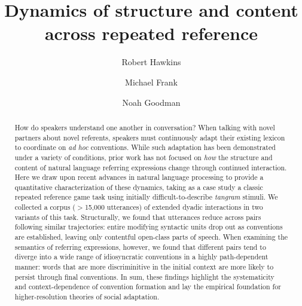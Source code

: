 \documentclass[alpha-refs]{wiley-article}
\title{Dynamics of structure and content across repeated reference}
\author[1]{Robert Hawkins}
\author[1]{Michael Frank}
\author[1,2]{Noah Goodman}
\affil[1]{Department of Psychology, Stanford University}
\affil[2]{Department of Computer Science, Stanford University}
\begin{document}
\maketitle





\begin{abstract}
How do speakers understand one another in conversation? 
When talking with novel partners about novel referents, speakers must continuously adapt their existing lexicon to coordinate on \emph{ad hoc} conventions. %
While such adaptation has been demonstrated under a variety of conditions, prior work has not focused on \emph{how} the structure and content of natural language referring expressions change through continued interaction.
Here we draw upon recent advances in natural language processing to provide a quantitative characterization of these dynamics, taking as a case study a classic repeated reference game task using initially difficult-to-describe \emph{tangram} stimuli.
We collected a corpus ($>$15,000 utterances) of extended dyadic interactions in two variants of this task.
Structurally, we found that utterances reduce across pairs following similar trajectories: entire modifying syntactic units drop out as conventions are established, leaving only contentful open-class parts of speech.
When examining the semantics of referring expressions, however, we found that different pairs tend to diverge into a wide range of idiosyncratic conventions in a highly path-dependent manner:  
words that are more discriminitive in the initial context are more likely to persist through final conventions.
In sum, these findings highlight the systematicity and context-dependence of convention formation and lay the empirical foundation for higher-resolution theories of social adaptation.

\end{abstract}
\end{document}
